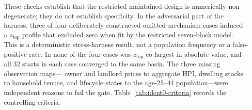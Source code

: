 These checks establish that the restricted maintained design is numerically
non-degenerate; they do not establish specificity.  In the adversarial part of
the harness, three of four deliberately constructed omitted-mechanism cases
induced a $z_{\mathrm{top}}$ profile that excluded zero when fit by the
restricted seven-block model.  This is a deterministic stress-harness result,
not a population frequency or a false-positive rate.  In none of the four
cases was $z_{\mathrm{top}}$ co-largest in absolute value, and all 32 starts in
each case converged to the same basin.  The three missing observation maps---
owner and landlord prices to aggregate HPI, dwelling stocks to household
tenure, and lifecycle states to the age-25--44 population---were independent
reasons to fail the gate.  Table~\ref{tab:ident0-criteria} records the
controlling criteria.


